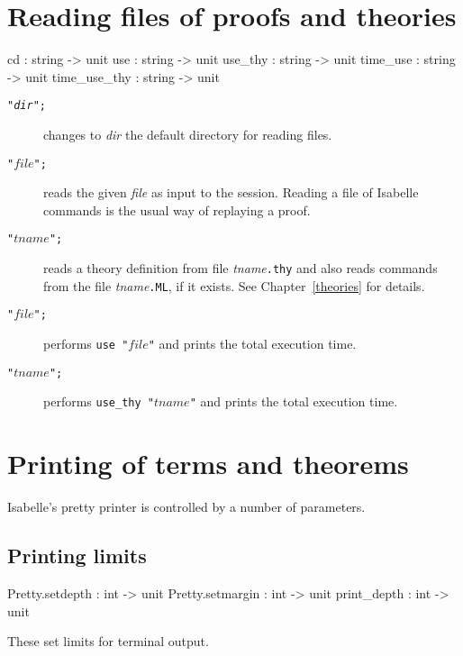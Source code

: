 \section{Reading files of proofs and theories}
\begin{ttbox} 
cd           : string -> unit
use          : string -> unit
use_thy      : string -> unit
time_use     : string -> unit
time_use_thy : string -> unit
\end{ttbox}
\begin{description}
\item[ \tt"{\it dir}";]  changes to {\it dir\/} the default
directory for reading files.

\item[ \tt"$file$";]  
reads the given {\it file} as input to the \ML{} session.  Reading a file
of Isabelle commands is the usual way of replaying a proof.

\item[ \tt"$tname$";]  
reads a theory definition from file {\it tname}{\tt.thy} and also reads
{\ML} commands from the file {\it tname}{\tt.ML}, if it exists.  See
Chapter~\ref{theories} for details.

\item[ \tt"$file$";]  
performs {\tt use~"$file$"} and prints the total execution time.

\item[ \tt"$tname$";]  
performs {\tt use_thy "$tname$"} and prints the total execution time.
\end{description}


\section{Printing of terms and theorems}
Isabelle's pretty printer is controlled by a number of parameters.

\subsection{Printing limits}
\begin{ttbox} 
Pretty.setdepth  : int -> unit
Pretty.setmargin : int -> unit
print_depth      : int -> unit
\end{ttbox}
These set limits for terminal output.

